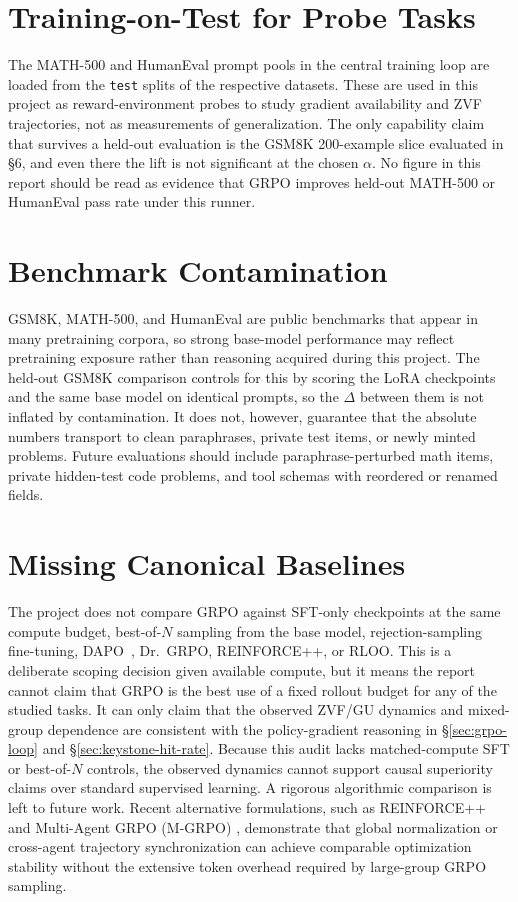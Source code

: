 \documentclass[12pt,a4paper]{report}
\begin{document}
\section*{Training-on-Test for Probe Tasks}
The MATH-500 and HumanEval prompt pools in the central training loop are loaded from the \texttt{test} splits of the respective datasets. These are used in this project as reward-environment probes to study gradient availability and ZVF trajectories, not as measurements of generalization. The only capability claim that survives a held-out evaluation is the GSM8K 200-example slice evaluated in §6, and even there the lift is not significant at the chosen $\alpha$. No figure in this report should be read as evidence that GRPO improves held-out MATH-500 or HumanEval pass rate under this runner.

\section*{Benchmark Contamination}
GSM8K, MATH-500, and HumanEval are public benchmarks that appear in many pretraining corpora, so strong base-model performance may reflect pretraining exposure rather than reasoning acquired during this project. The held-out GSM8K comparison controls for this by scoring the LoRA checkpoints and the same base model on identical prompts, so the $\Delta$ between them is not inflated by contamination. It does not, however, guarantee that the absolute numbers transport to clean paraphrases, private test items, or newly minted problems. Future evaluations should include paraphrase-perturbed math items, private hidden-test code problems, and tool schemas with reordered or renamed fields.

\section*{Missing Canonical Baselines}
The project does not compare GRPO against SFT-only checkpoints at the same compute budget, best-of-$N$ sampling from the base model, rejection-sampling fine-tuning, DAPO~\citep{yu2025dapo}, Dr.\ GRPO, REINFORCE++, or RLOO. This is a deliberate scoping decision given available compute, but it means the report cannot claim that GRPO is the best use of a fixed rollout budget for any of the studied tasks. It can only claim that the observed ZVF/GU dynamics and mixed-group dependence are consistent with the policy-gradient reasoning in \S\ref{sec:grpo-loop} and \S\ref{sec:keystone-hit-rate}. Because this audit lacks matched-compute SFT or best-of-$N$ controls, the observed dynamics cannot support causal superiority claims over standard supervised learning. A rigorous algorithmic comparison is left to future work. 
Recent alternative formulations, such as REINFORCE++ \citep{hu2025reinforceplusplus} and Multi-Agent GRPO (M-GRPO) \citep{hong2025m-grpo}, demonstrate that global normalization or cross-agent trajectory synchronization can achieve comparable optimization stability without the extensive token overhead required by large-group GRPO sampling.
\end{document}
